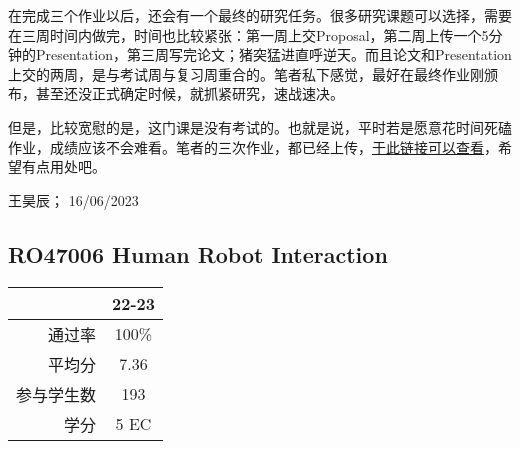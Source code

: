 在完成三个作业以后，还会有一个最终的研究任务。很多研究课题可以选择，需要在三周时间内做完，时间也比较紧张：第一周上交Proposal，第二周上传一个5分钟的Presentation，第三周写完论文；猪突猛进直呼逆天。而且论文和Presentation上交的两周，是与考试周与复习周重合的。笔者私下感觉，最好在最终作业刚颁布，甚至还没正式确定时候，就抓紧研究，速战速决。

但是，比较宽慰的是，这门课是没有考试的。也就是说，平时若是愿意花时间死磕作业，成绩应该不会难看。笔者的三次作业，都已经上传，\href{https://drive.google.com/drive/folders/1mJun-EmYGX1DovFISP9lXZNkdnutQpuh?usp=sharing}{\uline{于此链接可以查看}}，希望有点用处吧。
\begin{flushright}
王昊辰； 16/06/2023
\end{flushright}


\subsection{RO47006 Human Robot Interaction}\hypertarget{RO47006}{} 
\begin{minipage}{0.45\textwidth}
\centering
{}
\end{minipage}%
\begin{minipage}{0.45\textwidth}
\raggedleft
\begin{tabular}{r|c}
\textbf{ } & \textbf{22-23} \\ \hline
通过率 & 100\% \\ 
平均分 & 7.36 \\ 
参与学生数 & 193 \\ 
学分 & 5 EC\\
\end{tabular}
\end{minipage}\\

